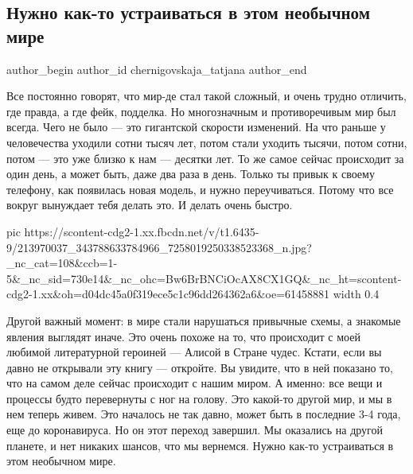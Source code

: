  
 
 
 
 
 
\subsection{Нужно как-то устраиваться в этом необычном мире}
\label{sec:05_07_2021.fb.chernigovskaja_tatjana.1.mir_alisa}
 
\ifcmt
 author_begin
   author_id chernigovskaja_tatjana
 author_end
\fi

Все постоянно говорят, что мир-де стал такой сложный, и очень трудно отличить,
где правда, а где фейк, подделка. Но многозначным и противоречивым мир был
всегда. Чего не было — это гигантской скорости изменений. На что раньше у
человечества уходили сотни тысяч лет, потом стали уходить тысячи, потом сотни,
потом — это уже близко к нам — десятки лет. То же самое сейчас происходит за
один день, а может быть, даже два раза в день. Только ты привык к своему
телефону, как появилась новая модель, и нужно переучиваться. Потому что все
вокруг вынуждает тебя делать это. И делать очень быстро.

\ifcmt
  pic https://scontent-cdg2-1.xx.fbcdn.net/v/t1.6435-9/213970037_343788633784966_7258019250338523368_n.jpg?_nc_cat=108&ccb=1-5&_nc_sid=730e14&_nc_ohc=Bw6BrBNCiOcAX8CX1GQ&_nc_ht=scontent-cdg2-1.xx&oh=d04dc45a0f319ece5c1c96dd264362a6&oe=61458881
  width 0.4
\fi

Другой важный момент: в мире стали нарушаться привычные схемы, а знакомые
явления выглядят иначе. Это очень похоже на то, что происходит с моей любимой
литературной героиней — Алисой в Стране чудес. Кстати, если вы давно не
открывали эту книгу — откройте. Вы увидите, что в ней показано то, что на самом
деле сейчас происходит с нашим миром. А именно: все вещи и процессы будто
перевернуты с ног на голову. Это какой-то другой мир, и мы в нем теперь живем.
Это началось не так давно, может быть в последние 3-4 года, еще до
коронавируса. Но он этот переход завершил. Мы оказались на другой планете, и
нет никаких шансов, что мы вернемся. Нужно как-то устраиваться в этом необычном
мире.

